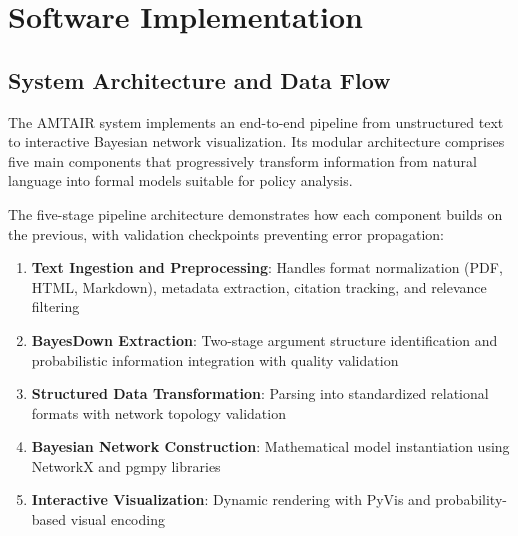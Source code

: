 \documentclass[
  11pt,
  letterpaper,
]{book}
\providecommand{\tightlist}{%
  \setlength{\itemsep}{0pt}\setlength{\parskip}{0pt}}
\begin{document}
\section{Software Implementation}\label{sec-software-implementation}

\subsection{System Architecture and Data
Flow}\label{sec-system-architecture}

The AMTAIR system implements an end-to-end pipeline from unstructured
text to interactive Bayesian network visualization. Its modular
architecture comprises five main components that progressively transform
information from natural language into formal models suitable for policy
analysis.

The five-stage pipeline architecture demonstrates how each component
builds on the previous, with validation checkpoints preventing error
propagation:

\begin{enumerate}
\def\labelenumi{\arabic{enumi}.}
\tightlist
\item
  \textbf{Text Ingestion and Preprocessing}: Handles format
  normalization (PDF, HTML, Markdown), metadata extraction, citation
  tracking, and relevance filtering
\item
  \textbf{BayesDown Extraction}: Two-stage argument structure
  identification and probabilistic information integration with quality
  validation
\item
  \textbf{Structured Data Transformation}: Parsing into standardized
  relational formats with network topology validation
\item
  \textbf{Bayesian Network Construction}: Mathematical model
  instantiation using NetworkX and pgmpy libraries
\item
  \textbf{Interactive Visualization}: Dynamic rendering with PyVis and
  probability-based visual encoding
\end{enumerate}
\end{document}
